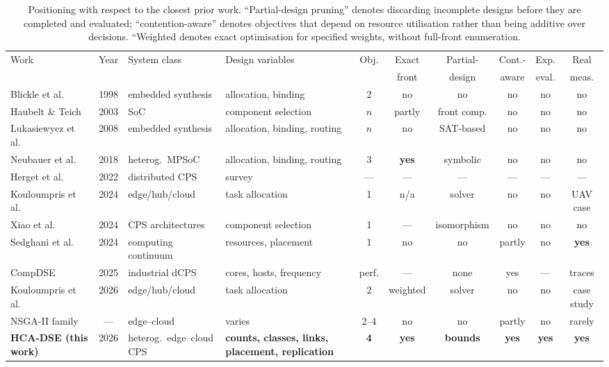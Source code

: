 \documentclass[preprint,11pt,3p]{elsarticle}
\theoremstyle{plain}
\theoremstyle{definition}
\begin{document}
\begin{table}[t]
\centering
\caption{Positioning with respect to the closest prior work. ``Partial-design pruning''
denotes discarding incomplete designs before they are completed and evaluated;
``contention-aware'' denotes objectives that depend on resource utilisation rather than
being additive over decisions. ``Weighted denotes exact optimisation for specified weights, without full-front enumeration.}
\label{tab:related}
\scriptsize
\setlength{\tabcolsep}{3pt}
\begin{tabular}{@{}p{2.5cm}c>{\raggedright\arraybackslash}p{1.95cm}>{\raggedright\arraybackslash}p{2.05cm}cccccc@{}}
\toprule
Work & Year & System class & Design variables & Obj. & Exact & Partial- & Cont.- &
Exp. & Real \\
 & & & & & front & design & aware & eval. & meas. \\
\midrule
Blickle et al.~\cite{blickle1998system} & 1998 & embedded synthesis &
  allocation, binding & 2 & no & no & no & no & no \\
Haubelt \& Teich~\cite{haubelt2003pareto} & 2003 & SoC & component selection & $n$ &
  partly & front comp. & no & no & no \\
Lukasiewycz et al.~\cite{lukasiewycz2008symbolic} & 2008 & embedded synthesis &
  allocation, binding, routing & $n$ & no & SAT-based & no & no & no \\
Neubauer et al.~\cite{neubauer2018exact} & 2018 & heterog.\ MPSoC &
  allocation, binding, routing & 3 & \textbf{yes} & symbolic & no & no & no \\
Herget et al.~\cite{herget2022dse} & 2022 & distributed CPS & survey & --- & --- &
  --- & --- & --- & --- \\
Kouloumpris et al.~\cite{kouloumpris2024optimization} & 2024 & edge/\allowbreak hub/\allowbreak cloud &
  task allocation & 1 & n/a & solver & no & no & UAV case \\
Xiao et al.~\cite{xiao2024contrarc} & 2024 & CPS architectures &
  component selection & 1 & --- & isomorphism & no & no & no \\
Sedghani et al.~\cite{sedghani2024space4aid} & 2024 & computing continuum &
  resources, placement & 1 & no & no & partly & no & \textbf{yes} \\
CompDSE~\cite{saadatmand2025compdse} & 2025 & industrial dCPS &
  cores, hosts, frequency & perf. & --- & none & yes & --- & traces \\
Kouloumpris et al.~\cite{kouloumpris2026reliability} & 2026 & edge/\allowbreak hub/\allowbreak cloud &
  task allocation & 2 & weighted & solver & no & no & case study \\
NSGA-II family~\cite{deb2002nsga2} & --- & edge--cloud & varies & 2--4 & no & no &
  partly & no & rarely \\
\textbf{HCA-DSE (this work)} & 2026 & heterog.\ edge--cloud CPS &
  \textbf{counts, classes, links, placement, replication} & \textbf{4} &
  \textbf{yes} & \textbf{bounds} & \textbf{yes} & \textbf{yes} & \textbf{yes} \\
\bottomrule
\end{tabular}
\end{table}
\end{document}
